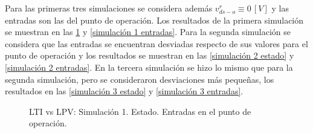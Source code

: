 \documentclass[a4paper, 10pt, onecolumn,journal]{ieeeconf}
\begin{document}
Para las primeras tres simulaciones se considera además  $v^r_{ds-o}\equiv 0 \,\left[V\right]$ y las entradas son las del punto de operación.
Los resultados de la primera simulación se muestran en las \cref{simulación 1 estado} y \cref{simulación 1 entradas}.
Para la segunda simulación se considera que las entradas se encuentran desviadas respecto de sus valores para el punto de operación y los resultados se muestran
en las \cref{simulación 2 estado} y \cref{simulación 2 entradas}. En la tercera simulación se hizo lo mismo que para la segunda simulación, pero se consideraron desviaciones más
pequeñas, los resultados en las \cref{simulación 3 estado} y \cref{simulación 3 entradas}.



\begin{figure}[H]
	\centering
	\begin{adjustbox}{max width=\columnwidth}
	\end{adjustbox}
	\caption{LTI vs LPV: Simulación 1. Estado. Entradas en el punto de operación.}
	\label{simulación 1 estado}
\end{figure}
\end{document}
